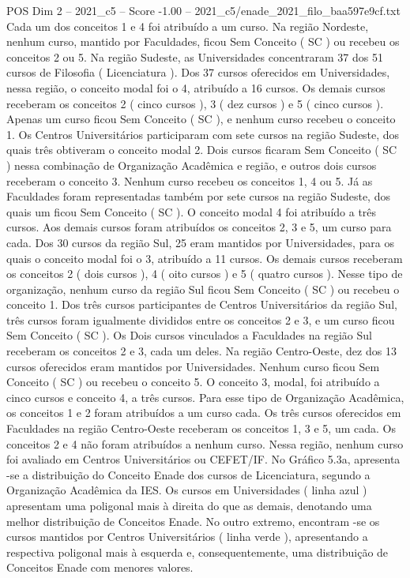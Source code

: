 \begin{textsample}{POS Dim 2 – 2021\_c5 – Score -1.00 – 2021\_c5/enade\_2021\_filo\_baa597e9cf.txt}
Cada um dos conceitos 1 e 4 foi atribuído a um curso.
Na região Nordeste, nenhum curso, mantido por Faculdades, ficou Sem Conceito ( SC ) ou recebeu os conceitos 2 ou 5.
Na região Sudeste, as Universidades concentraram 37 dos 51 cursos de Filosofia ( Licenciatura ).
Dos 37 cursos oferecidos em Universidades, nessa região, o conceito modal foi o 4, atribuído a 16 cursos.
Os demais cursos receberam os conceitos 2 ( cinco cursos ), 3 ( dez cursos ) e 5 ( cinco cursos ).
Apenas um curso ficou Sem Conceito ( SC ), e nenhum curso recebeu o conceito 1.
Os Centros Universitários participaram com sete cursos na região Sudeste, dos quais três obtiveram o conceito modal 2.
Dois cursos ficaram Sem Conceito ( SC ) nessa combinação de Organização Acadêmica e região, e outros dois cursos receberam o conceito 3.
Nenhum curso recebeu os conceitos 1, 4 ou 5.
Já as Faculdades foram representadas também por sete cursos na região Sudeste, dos quais um ficou Sem Conceito ( SC ).
O conceito modal 4 foi atribuído a três cursos.
Aos demais cursos foram atribuídos os conceitos 2, 3 e 5, um curso para cada.
Dos 30 cursos da região Sul, 25 eram mantidos por Universidades, para os quais o conceito modal foi o 3, atribuído a 11 cursos.
Os demais cursos receberam os conceitos 2 ( dois cursos ), 4 ( oito cursos ) e 5 ( quatro cursos ).
Nesse tipo de organização, nenhum curso da região Sul ficou Sem Conceito ( SC ) ou recebeu o conceito 1.
Dos três cursos participantes de Centros Universitários da região Sul, três cursos foram igualmente divididos entre os conceitos 2 e 3, e um curso ficou Sem Conceito ( SC ).
Os Dois cursos vinculados a Faculdades na região Sul receberam os conceitos 2 e 3, cada um deles.
Na região Centro-Oeste, dez dos 13 cursos oferecidos eram mantidos por Universidades.
Nenhum curso ficou Sem Conceito ( SC ) ou recebeu o conceito 5.
O conceito 3, modal, foi atribuído a cinco cursos e conceito 4, a três cursos.
Para esse tipo de Organização Acadêmica, os conceitos 1 e 2 foram atribuídos a um curso cada.
Os três cursos oferecidos em Faculdades na região Centro-Oeste receberam os conceitos 1, 3 e 5, um cada.
Os conceitos 2 e 4 não foram atribuídos a nenhum curso.
Nessa região, nenhum curso foi avaliado em Centros Universitários ou CEFET/IF.
No Gráfico 5.3a, apresenta -se a distribuição do Conceito Enade dos cursos de Licenciatura, segundo a Organização Acadêmica da IES.
Os cursos em Universidades ( linha azul ) apresentam uma poligonal mais à direita do que as demais, denotando uma melhor distribuição de Conceitos Enade.
No outro extremo, encontram -se os cursos mantidos por Centros Universitários ( linha verde ), apresentando a respectiva poligonal mais à esquerda e, consequentemente, uma distribuição de Conceitos Enade com menores valores.

\end{textsample}
